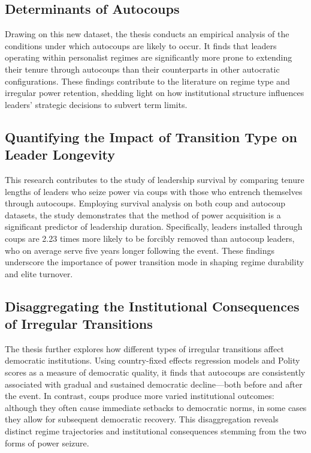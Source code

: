 \documentclass[
  12pt,
]{report}
\begin{document}
\subsection*{Determinants of Autocoups}\label{determinants-of-autocoups}

Drawing on this new dataset, the thesis conducts an empirical analysis
of the conditions under which autocoups are likely to occur. It finds
that leaders operating within personalist regimes are significantly more
prone to extending their tenure through autocoups than their
counterparts in other autocratic configurations. These findings
contribute to the literature on regime type and irregular power
retention, shedding light on how institutional structure influences
leaders' strategic decisions to subvert term limits.

\subsection*{Quantifying the Impact of Transition Type on Leader
Longevity}\label{quantifying-the-impact-of-transition-type-on-leader-longevity}

This research contributes to the study of leadership survival by
comparing tenure lengths of leaders who seize power via coups with those
who entrench themselves through autocoups. Employing survival analysis
on both coup and autocoup datasets, the study demonstrates that the
method of power acquisition is a significant predictor of leadership
duration. Specifically, leaders installed through coups are 2.23 times
more likely to be forcibly removed than autocoup leaders, who on average
serve five years longer following the event. These findings underscore
the importance of power transition mode in shaping regime durability and
elite turnover.

\subsection*{Disaggregating the Institutional Consequences of Irregular
Transitions}\label{disaggregating-the-institutional-consequences-of-irregular-transitions}

The thesis further explores how different types of irregular transitions
affect democratic institutions. Using country-fixed effects regression
models and Polity scores as a measure of democratic quality, it finds
that autocoups are consistently associated with gradual and sustained
democratic decline---both before and after the event. In contrast, coups
produce more varied institutional outcomes: although they often cause
immediate setbacks to democratic norms, in some cases they allow for
subsequent democratic recovery. This disaggregation reveals distinct
regime trajectories and institutional consequences stemming from the two
forms of power seizure.
\end{document}
